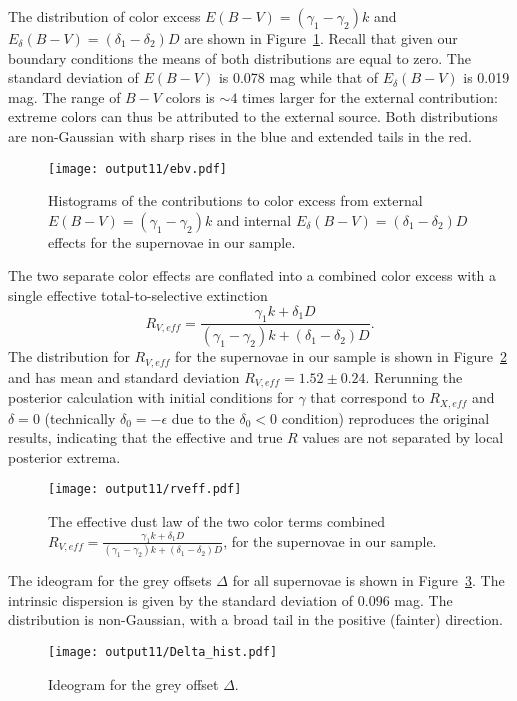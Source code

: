 \documentclass{aastex}   	%
\begin{document}
The distribution of color excess $E(B-V) =(\gamma_1-\gamma_2)k$ and
 $E_\delta(B-V) = (\delta_1-\delta_2)D$ are shown in Figure~\ref{ebv:fig}.
Recall that given our boundary conditions the means of both distributions are equal to zero. 
The standard deviation of $E(B-V)$ is 0.078 mag while that of $E_\delta(B-V)$ is 0.019 mag.
The range of $B-V$ colors is $\sim 4$ times larger for the external contribution:
extreme colors can thus be attributed to the external source. 
Both distributions are non-Gaussian with sharp rises in the blue and extended tails in the red.
\begin{figure}[htbp] %
   \centering
   \texttt{[image: output11/ebv.pdf]}
   \caption{Histograms of the contributions to color excess from external $E(B-V) =(\gamma_1-\gamma_2)k$ and
   internal $E_\delta(B-V) = (\delta_1-\delta_2)D$ effects for the supernovae in our sample.
   \label{ebv:fig}}
\end{figure}

The two separate color effects are conflated into a combined color excess with a single effective total-to-selective extinction
\begin{equation}
R_{V,eff}  = \frac{\gamma_1 k + \delta_1 D}{(\gamma_1-\gamma_2) k + (\delta_1-\delta_2)D}.
\label{RVeff:eqn}
\end{equation}
The distribution for $R_{V,eff}$ for the supernovae in our sample is shown in Figure~\ref{rveff:fig}
and has mean and standard deviation  $R_{V,eff}  = 1.52 \pm 0.24$.  
Rerunning the posterior calculation with initial conditions for $\gamma$  that correspond to $R_{X,eff}$ 
and $\delta=0$ (technically $\delta_0 = -\epsilon$ due to the $\delta_0<0$ condition)
reproduces the original results, indicating that
the effective and true $R$ values are not separated by local posterior extrema.
\begin{figure}[htbp] %
   \centering
   \texttt{[image: output11/rveff.pdf]}
   \caption{The effective dust law of the two color terms combined $R_{V,eff}  = \frac{\gamma_1 k + \delta_1 D}{(\gamma_1-\gamma_2) k + (\delta_1-\delta_2)D}$,
   for the supernovae in our sample.
   \label{rveff:fig}}
\end{figure}


The ideogram for the grey offsets $\Delta$ for all supernovae is shown in Figure~\ref{hist:fig}.  The intrinsic dispersion
is given by the standard deviation of $0.096$ mag.  The distribution is non-Gaussian, with a broad tail in the positive (fainter) direction.
\begin{figure}[htbp] %
   \centering
   \texttt{[image: output11/Delta\_hist.pdf]} 
   \caption{Ideogram for the grey offset $\Delta$.
   \label{hist:fig}}
\end{figure}
\end{document}
